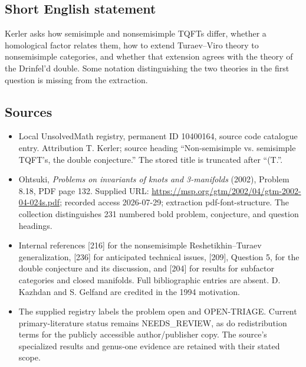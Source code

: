 \documentclass[11pt]{article}
\begin{document}
\subsection{Short English statement}
Kerler asks how semisimple and nonsemisimple TQFTs differ, whether a homological factor relates them, how to extend Turaev--Viro theory to nonsemisimple categories, and whether that extension agrees with the theory of the Drinfel'd double. Some notation distinguishing the two theories in the first question is missing from the extraction.
\subsection{Sources}
\begin{itemize}
\item Local UnsolvedMath registry, permanent ID 10400164, source code catalogue entry. Attribution T. Kerler; source heading ``Non-semisimple vs. semisimple TQFT's, the double conjecture.'' The stored title is truncated after ``(T.''.
\item Ohtsuki, \emph{Problems on invariants of knots and 3-manifolds} (2002), Problem 8.18, PDF page 132. Supplied URL: \url{https://msp.org/gtm/2002/04/gtm-2002-04-024s.pdf}; recorded access 2026-07-29; extraction pdf-font-structure. The collection distinguishes 231 numbered bold problem, conjecture, and question headings.
\item Internal references [216] for the nonsemisimple Reshetikhin--Turaev generalization, [236] for anticipated technical issues, [209], Question 5, for the double conjecture and its discussion, and [204] for results for subfactor categories and closed manifolds. Full bibliographic entries are absent. D. Kazhdan and S. Gelfand are credited in the 1994 motivation.
\item The supplied registry labels the problem open and OPEN-TRIAGE. Current primary-literature status remains NEEDS\_REVIEW, as do redistribution terms for the publicly accessible author/publisher copy. The source's specialized results and genus-one evidence are retained with their stated scope.
\end{itemize}
\end{document}
